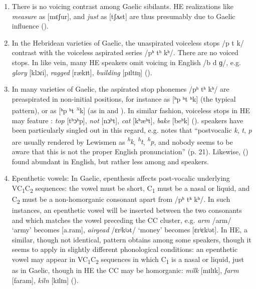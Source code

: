 \documentclass[output=paper,colorlinks,citecolor=brown]{langscibook}
\begin{document}
\begin{enumerate}
\item There is no voicing contrast among Gaelic sibilants. HE realizations like \textit{measure} as [mɛʃur], and \textit{just} as [tʃʌst] are thus presumably due to Gaelic influence (\citealt{Shuken:1985, Wells:1982}).

\item In the Hebridean varieties of Gaelic, the unaspirated voiceless stops /p t k/ contrast with the voiceless aspirated series /pʰ tʰ kʰ/. There are no voiced stops. In like vein, many HE speakers omit voicing in English /b d ɡ/, e.g. \textit{glory} [klɔɾi], \textit{ragged} [rækɪt], \textit{building} [pɪltɪŋ] (\citealt{Grant:1913, Borgstrom:1940, Oftedal:1956, Wells:1982, Ladefoged:1998, ic:Gillies2009sg}).


\item In many varieties of Gaelic, the aspirated stop phonemes /pʰ tʰ kʰ/ are preaspirated in non-initial positions, for instance as [ʰp ʰt ʰk] (the typical  pattern), or as [ʰp ʰt \textsuperscript{x}k] (as in  and ). In similar fashion, voiceless stops in HE may feature :  \textit{top} [tʰɔʰp], \textit{not} [nɔʰt], \textit{cat} [kʰæʰt], \textit{bake} [beʰk] (\citealt{Borgstrom:1940, Oftedal:1956, Shuken:1979, Ni-Chasaide:1985, Ladefoged:1998, Clayton:2010, Nance:2013}).  speakers have been particularly singled out in this regard, e.g. \citet{Borgstrom:1940} notes that “postvocalic  \textit{k}, \textit{t}, \textit{p} are usually rendered by Lewismen as \textit{\textsuperscript{h}}\textit{k}, \textit{\textsuperscript{h}}\textit{t}, \textit{\textsuperscript{h}}\textit{p}, and nobody seems to be aware that this is not the proper English pronunciation” (p. 21). Likewise, \citeauthor{Shuken:1984} (\citeyear{Shuken:1984, Shuken:1985}) found abundant  in  English, but rather less among  and  speakers.
\item Epenthetic vowels: In Gaelic, epenthesis affects post-vocalic underlying VC\textsubscript{1}C\textsubscript{2} sequences: the vowel must be short, C\textsubscript{1} must be a nasal or liquid, and C\textsubscript{2} must be a non-homorganic consonant apart from /pʰ tʰ kʰ/. In such instances, an epenthetic vowel will be inserted between the two consonants and which matches the vowel preceding the CC cluster, e.g. \textit{arm}  /arm/ ‘army’ becomes [a.ram], \textit{airgead}  /ɛrʲkʲət/ ‘money’ becomes [ɛrʲɛkʲət]. In HE, a similar, though not identical, pattern obtains among some speakers, though it seems to apply in slightly different phonological conditions: an epenthetic vowel may appear in VC\textsubscript{1}C\textsubscript{2} sequences in which C\textsubscript{1} is a nasal or liquid, just as in Gaelic, though in HE the CC may be homorganic: \textit{milk} [mɪlɪk], \textit{farm} [faram], \textit{kiln} [kɪlɪn] (\citealt{Hammond:2014, Smith:1999, Bosch:1997}).


\end{enumerate}
\end{document}
